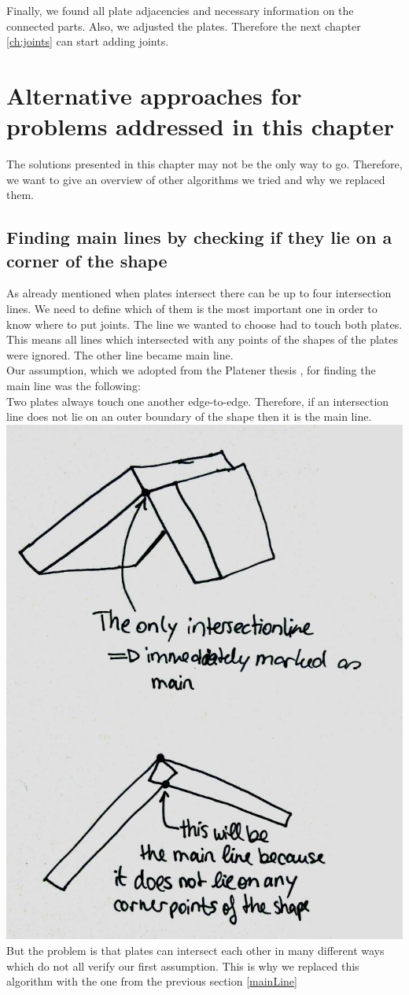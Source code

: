 \documentclass[../ClassicThesis.tex]{subfiles}
\begin{document}
Finally, we found all plate adjacencies and necessary information on the connected parts. Also, we adjusted the plates. Therefore the next chapter \ref{ch:joints} can start adding joints.

\section{Alternative approaches for problems addressed in this chapter}
The solutions presented in this chapter may not be the only way to go. Therefore, we want to give an overview of other algorithms we tried and why we replaced them.

\subsection{Finding main lines by checking if they lie on a corner of the shape}
As already mentioned when plates intersect there can be up to four intersection lines. We need to define which of them is the most important one in order to know where to put joints. The line we wanted to choose had to touch both plates.
This means all lines which intersected with any points of the shapes of the plates were ignored. The other line became main line.\\
Our assumption, which we adopted from the Platener thesis ,  for finding the main line was the following:\\
Two plates always touch one another edge-to-edge. Therefore, if an intersection line does not lie on an outer boundary of the shape then it is the main line.\\
\includegraphics[width=.5\columnwidth]{Images/06-1-graph-assumptionMainLine.jpg}\\
But the problem is that plates can intersect each other in many different ways which do not all verify our first assumption. 
This is why we replaced this algorithm with the one from the previous section \ref{mainLine}
\end{document}
